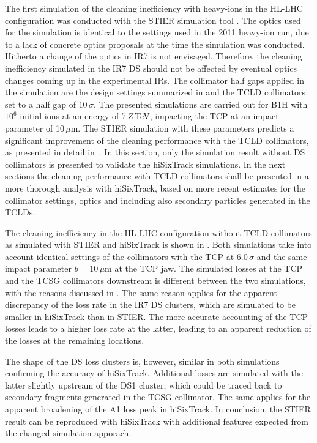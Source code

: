 The first simulation of the cleaning inefficiency with heavy-ions in the HL-LHC configuration was conducted with the STIER simulation tool . The optics used for the simulation is identical to the settings used in the 2011 heavy-ion run, due to a lack of concrete optics proposals at the time the simulation was conducted. Hitherto a change of the optics in IR7 is not envisaged. Therefore, the cleaning inefficiency simulated in the IR7 DS should not be affected by eventual optics changes coming up in the experimental IRs. The collimator half gaps applied in the simulation are the design settings summarized in  and the TCLD collimators set to a half gap of $10\,\sigma$. The presented simulations are carried out for B1H with $10^6$ initial \lead ions at an energy of 7$\,Z\,$TeV, impacting the TCP at an impact parameter of 10$\,\mu$m. The STIER simulation with these parameters predicts a significant improvement of the cleaning performance with the TCLD collimators, as presented in detail in~\cite{phermes_ipac2015_1}. In this section, only the simulation result without DS collimators is presented to validate the hiSixTrack simulations. In the next sections the cleaning performance with TCLD collimators shall be presented in a more thorough analysis with hiSixTrack, based on more recent estimates for the collimator settings, optics and including also secondary particles generated in the TCLDs. 


The cleaning inefficiency in the HL-LHC configuration without TCLD collimators as simulated with STIER and hiSixTrack is shown in . Both simulations take into account identical settings of the collimators with the TCP at 6.0$\,\sigma$ and the same impact parameter $b=10\,\mu$m at the TCP jaw. The simulated losses at the TCP and the TCSG collimators downstream is different between the two simulations, with the reasons discussed in . The same reason applies for the apparent discrepancy of the loss rate in the IR7 DS clusters, which are simulated to be smaller in hiSixTrack than in STIER. The more accurate accounting  of the TCP losses leads to a higher loss rate at the latter, leading to an apparent reduction of the losses at the remaining locations. 

The shape of the DS loss clusters is, however, similar in both simulations confirming the accuracy of hiSixTrack. Additional losses are simulated with the latter slightly upstream of the DS1 cluster, which could be traced back to secondary fragments generated in the TCSG collimator. The same applies for the apparent broadening of the A1 loss peak in hiSixTrack. In conclusion, the STIER result can be reproduced with hiSixTrack with additional features expected from the changed simulation apporach.  




